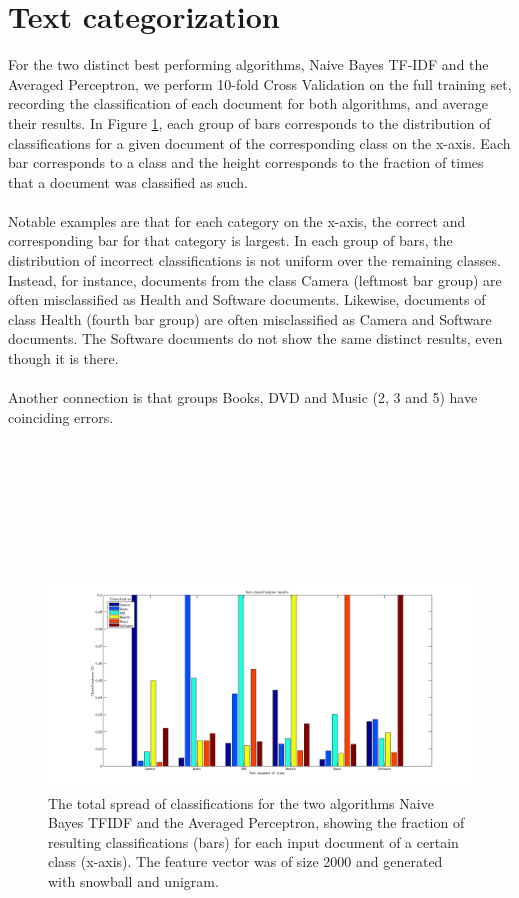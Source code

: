 \section{Text categorization}
For the two distinct best performing algorithms, Naive Bayes TF-IDF and the Averaged Perceptron, we perform 10-fold Cross Validation on the full training set, recording the classification of each document for both algorithms, and average their results. In Figure \ref{fig:textcategorization}, each group of bars corresponds to the distribution of classifications for a given document of the corresponding class on the x-axis. Each bar corresponds to a class and the height corresponds to the fraction of times that a document was classified as such.
\\\\
Notable examples are that for each category on the x-axis, the correct and corresponding bar for that category is largest. In each group of bars, the distribution of incorrect classifications is not uniform over the remaining classes. Instead, for instance, documents from the class Camera (leftmost bar group) are often misclassified as Health and Software documents. Likewise, documents of class Health (fourth bar group) are often misclassified as Camera and Software documents. The Software documents do not show the same distinct results, even though it is there.
\\\\
Another connection is that groups Books, DVD and Music (2, 3 and 5) have coinciding errors.\\\\\\\\\\\\\\\\
\begin{figure}[h!]
	\centering
	\includegraphics[width=1\linewidth]{../Plottar/text_categorization.png}
	\caption{The total spread of classifications for the two algorithms Naive Bayes TFIDF and the Averaged Perceptron, showing the fraction of resulting classifications (bars) for each input document of a certain class (x-axis). The feature vector was of size 2000 and generated with snowball and unigram.}
	\label{fig:textcategorization}
\end{figure}  



